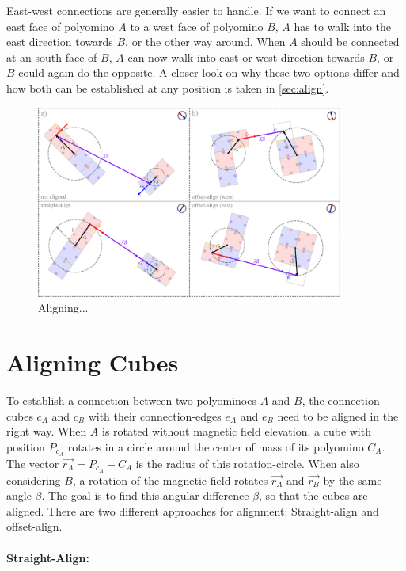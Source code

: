 East-west connections are generally easier to handle.
If we want to connect an east face of polyomino $A$ to a west face of polyomino $B$, $A$ has to walk into the east direction towards $B$, or the other way around.
When $A$ should be connected at an south face of $B$, $A$ can now walk into east or west direction towards $B$, or $B$ could again do the opposite.
A closer look on why these two options differ and how both can be established at any position is taken in \autoref{sec:align}.

\begin{figure}
	\centering
	\includegraphics[width=0.90\textwidth]{figures/aligning.pdf}
	\caption{Aligning...}
	\label{fig:aligning}
\end{figure}

\section{Aligning Cubes}
\label{sec:align}

To establish a connection between two polyominoes $A$ and $B$, the connection-cubes $c_A$ and $c_B$ with their connection-edges $e_A$ and $e_B$ need to be aligned in the right way.
When $A$ is rotated without magnetic field elevation, a cube with position $P_{c_A}$ rotates in a circle around the center of mass of its polyomino $C_A$.
The vector $\vec{r_A} = P_{c_A} - C_A$ is the radius of this rotation-circle.
When also considering $B$, a rotation of the magnetic field rotates $\vec{r_A}$ and $\vec{r_B}$ by the same angle $\beta$.
The goal is to find this angular difference $\beta$, so that the cubes are aligned.
There are two different approaches for alignment: Straight-align and offset-align.

\paragraph{Straight-Align:}

